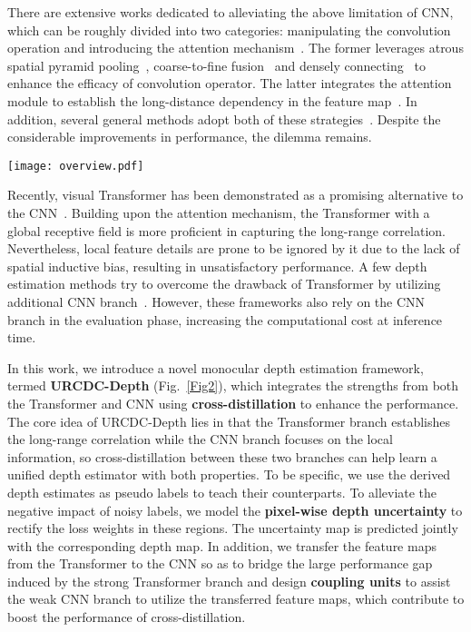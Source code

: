 \documentclass[letterpaper]{article} \usepackage{aaai23}  \usepackage{times}  \usepackage{helvet}  \usepackage{courier}  \usepackage[hyphens]{url}  \usepackage{graphicx} \urlstyle{rm} \def\UrlFont{\rm}  \usepackage{natbib}  \usepackage{caption} \frenchspacing  \setlength{\pdfpagewidth}{8.5in} \setlength{\pdfpageheight}{11in} \usepackage{algorithm}
\begin{document}
There are extensive works dedicated to alleviating the above limitation of CNN, which can be roughly divided into two categories: manipulating the convolution operation and introducing the attention mechanism~\cite{vaswani2017attention}. The former leverages atrous spatial pyramid pooling~\cite{chen2017deeplab}, coarse-to-fine fusion~\cite{lin2017feature} and densely connecting~\cite{zhang2020densely} to enhance the efficacy of convolution operator. The latter integrates the attention module to establish the long-distance dependency in the feature map~\cite{zhou2019unsupervised,johnston2020self}. In addition, several general methods adopt both of these strategies~\cite{huynh2020guiding, bhat2021adabins}. Despite the considerable improvements in performance, the dilemma remains.


\begin{figure*}[!htb]
\centering
	\texttt{[image: overview.pdf]}\caption{\textbf{Overview of the developed URCDC-Depth}. Our URCDC-Depth in the training phase consists of two branches, a Transformer branch and a CNN branch. During the evaluation phase, we only leverage the Transformer branch to generate the depth map.}
	\label{Fig2}
\end{figure*}

Recently, visual Transformer has been demonstrated as a promising alternative to the CNN~\cite{dosovitskiy2020image,Liu_2021_ICCV,Peng_2021_ICCV}. Building upon the attention mechanism, the Transformer with a global receptive field is more proficient in capturing the long-range correlation. Nevertheless, local feature details are prone to be ignored by it due to the lack of spatial inductive bias, resulting in unsatisfactory performance. A few depth estimation methods try to overcome the drawback of Transformer by utilizing additional CNN branch~\cite{li2022depthformer,shao2021nenet}. However, these frameworks also rely on the CNN branch in the evaluation phase, increasing the computational cost at inference time.

In this work, we introduce a novel monocular depth estimation framework, termed \textbf{URCDC-Depth} (Fig.~\ref{Fig2}), which integrates the strengths from both the Transformer and CNN using \textbf{cross-distillation} to enhance the performance. The core idea of URCDC-Depth lies in that the Transformer branch establishes the long-range correlation while the CNN branch focuses on the local information, so cross-distillation between these two branches can help learn a unified depth estimator with both properties. To be specific, we use the derived depth estimates as pseudo labels to teach their counterparts. To alleviate the negative impact of noisy labels, we model the \textbf{pixel-wise depth uncertainty} to rectify the loss weights in these regions. The uncertainty map is predicted jointly with the corresponding depth map. In addition, we transfer the feature maps from the Transformer to the CNN so as to bridge the large performance gap induced by the strong Transformer branch and design \textbf{coupling units} to assist the weak CNN branch to utilize the transferred feature maps, which contribute to boost the performance of cross-distillation.
\end{document}
